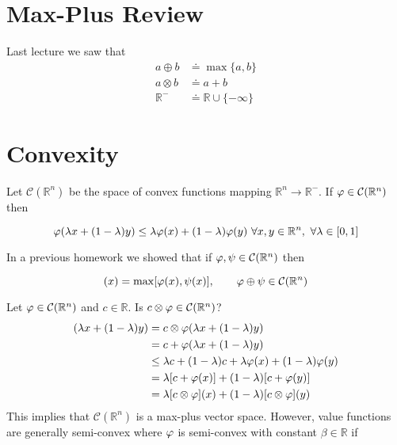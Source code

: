 \mainmatter%
\setcounter{page}{1}

\lectureseries[\course]{\course}

\date{December 3, 2009}

\setaddress%

\setcounter{lecture}{17}
\setcounter{chapter}{17}


\section{Max-Plus Review}
Last lecture we saw that
\begin{align*}
a\oplus b &\doteq \max\{a,b\} \\
a\otimes b &\doteq a+b \\
\mathbb{R}^- &\doteq \mathbb{R}\cup\{-\infty\}
\end{align*}

\section{Convexity}
Let $\mathcal{C}(\mathbb{R}^n)$ be the space of convex functions mapping $\mathbb{R}^n\to\mathbb{R}^-$.
If $\varphi\in\mathcal{C}(\mathbb{R}^n)$ then

\begin{equation*}
\varphi(\lambda x+(1-\lambda)y) \leq \lambda\varphi(x) + (1-\lambda)\varphi(y)~\forall x,y\in\mathbb{R}^n,~\forall \lambda\in[0,1]
\end{equation*}

In a previous homework we showed that if $\varphi,\psi\in\mathcal{C}(\mathbb{R}^n)$ then

\begin{equation*}
[\vp\oplus\psi](x) = \max[\vp(x),\psi(x)], \qquad \vp\oplus\psi\in\mathcal{C}(\mathbb{R}^n)
\end{equation*}

Let $\varphi\in\mathcal{C}(\mathbb{R}^n)$ and $c\in\mathbb{R}$.
Is $c\otimes\varphi\in\mathcal{C}(\mathbb{R}^n)$?
\begin{align*}
[c\otimes\vp](\lambda x+(1-\lambda)y) &= c\otimes\vp(\lambda x+(1-\lambda)y) \\
&= c + \vp(\lambda x+(1-\lambda)y) \\
&\leq \lambda c + (1-\lambda)c + \lambda\vp(x) + (1-\lambda)\vp(y) \\
&= \lambda[c+\vp(x)] + (1-\lambda)[c+\vp(y)] \\
&= \lambda[c\otimes\vp](x) + (1-\lambda)[c\otimes\vp](y)
\end{align*}
This implies that $\mathcal{C}(\mathbb{R}^n)$ is a max-plus vector space.
However, value functions are generally semi-convex where $\varphi$ is semi-convex with constant $\beta\in\mathbb{R}$ if


